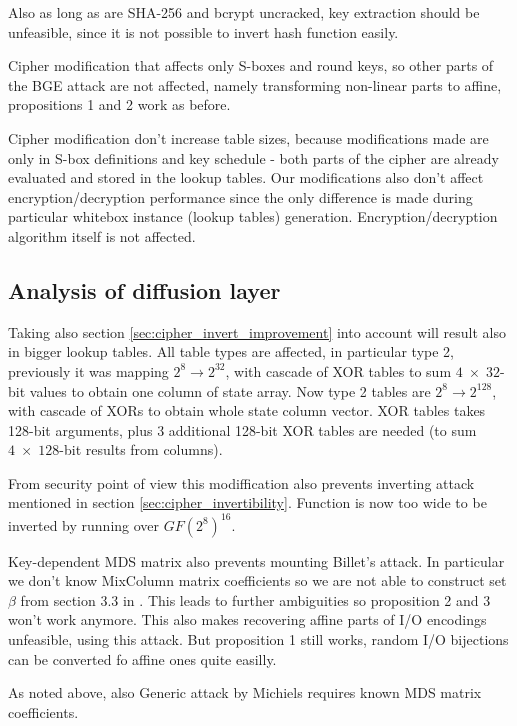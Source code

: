 \documentclass[11pt,oneside,final]{fithesis2}
\begin{document}
    Also as long as are SHA-256 and bcrypt uncracked, key extraction should be unfeasible, since it is not possible
    to invert hash function easily. 

    Cipher modification that affects only S-boxes and round keys, so other parts of the BGE attack are not affected, namely transforming non-linear parts
    to affine, propositions 1 and 2 work as before. 

    Cipher modification don't increase table sizes, because modifications made are only in S-box definitions and key schedule - both 
    parts of the cipher are already evaluated and stored in the lookup tables. Our modifications also don't affect encryption/decryption performance since the only
    difference is made during particular whitebox instance (lookup tables) generation. Encryption/decryption algorithm itself is not affected.
    
    \subsection{Analysis of diffusion layer}
    Taking also section \ref{sec:cipher_invert_improvement} into account will result also in bigger lookup tables. All table types are affected, in particular type 2, previously 
    it was mapping $2^8 \rightarrow 2^{32}$, with cascade of XOR tables to sum $4 \; \times\; 32$-bit values to obtain one column of state array. Now type 2 tables are
    $2^8 \rightarrow 2^{128}$, with cascade of XORs to obtain whole state column vector. XOR tables takes 128-bit arguments, plus 3 additional 128-bit XOR tables 
    are needed (to sum $4 \; \times\; 128$-bit results from columns).
    
    From security point of view this modiffication also prevents inverting attack mentioned in section \ref{sec:cipher_invertibility}. Function is now too wide to be
    inverted by running over $GF(2^8)^{16}$. 
    
    Key-dependent MDS matrix also prevents mounting Billet's attack. In particular we don't know MixColumn matrix coefficients so we are not able to construct set $\beta$
    from section 3.3 in \cite{Billet:2004:CWB:2080787.2080809}. This leads to further ambiguities so proposition 2 and 3 won't work anymore. This also makes recovering 
    affine parts of I/O encodings unfeasible, using this attack. But proposition 1 still works, random I/O bijections can be converted fo affine ones quite easilly.

    As noted above, also  Generic attack by Michiels \citep{Michiels:2007:MST:1314276.1314291} requires known MDS matrix coefficients.
    
\end{document}
